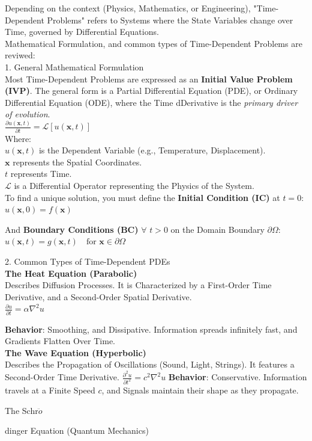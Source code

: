 \documentclass[a4paper, 10pt, onepage]{elegantbook}
\begin{document}
{Depending on the context (Physics, Mathematics, or Engineering), "Time-Dependent Problems" refers to Systems where the State Variables change over Time, governed by Differential Equations.  \\

Mathematical Formulation, and common types of Time-Dependent Problems are reviwed:  \\

1. General Mathematical Formulation  \\

Most Time-Dependent Problems are expressed as an \textbf{Initial Value Problem (IVP)}. The general form is a Partial Differential Equation (PDE), or Ordinary Differential Equation (ODE), where the Time dDerivative is the \emph{primary driver of evolution}.  \\

$\frac{\partial u(\mathbf{x}, t)}{\partial t} = \mathcal{L}[u(\mathbf{x}, t)]$  \\
Where: \\
 $u(\mathbf{x}, t)$ is the Dependent Variable (e.g., Temperature, Displacement).  \\
 $\mathbf{x}$ represents the Spatial Coordinates.  \\ 
 $t$ represents Time.  \\

 $\mathcal{L}$ is a Differential Operator representing the Physics of the System.  \\

To find a unique solution, you must define the \textbf{Initial Condition (IC)} at $t=0$:  \\
$ u(\mathbf{x}, 0) = f(\mathbf{x})$

And \textbf{Boundary Conditions (BC)} $\forall$ $t > 0$ on the Domain Boundary $\partial \Omega$:
$ u(\mathbf{x}, t) = g(\mathbf{x}, t) \quad \text{for } \mathbf{x} \in \partial \Omega $

2. Common Types of Time-Dependent PDEs  \\

   \textbf{The Heat Equation (Parabolic)}  \\

Describes Diffusion Processes. It is Characterized by a First-Order Time Derivative, and a Second-Order Spatial Derivative.  \\
$ \frac{\partial u}{\partial t} = \alpha \nabla^2 u $   

\textbf{Behavior}: Smoothing, and Dissipative. Information spreads infinitely fast, and Gradients Flatten Over Time.  \\

     \textbf{The Wave Equation (Hyperbolic)}  \\

Describes the Propagation of Oscillations (Sound, Light, Strings). It features a Second-Order Time Derivative.
$\frac{\partial^2 u}{\partial t^2} = c^2 \nabla^2 u$
   \textbf{Behavior}: Conservative. Information travels at a Finite Speed $c$, and Signals maintain their shape as they propagate.

    The Schr$\ddot{o}$}dinger Equation (Quantum Mechanics)  \\
\end{document}
